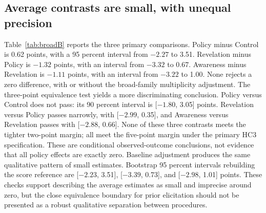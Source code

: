 \subsection{Average contrasts are small, with unequal precision}
Table~\ref{tab:broadB} reports the three primary comparisons. Policy minus Control is 0.62 points, with a 95 percent interval from $-2.27$ to 3.51. Revelation minus Policy is $-1.32$ points, with an interval from $-3.32$ to 0.67. Awareness minus Revelation is $-1.11$ points, with an interval from $-3.22$ to 1.00. None rejects a zero difference, with or without the broad-family multiplicity adjustment.
The three-point equivalence test yields a more discriminating conclusion. Policy versus Control does not pass: its 90 percent interval is [$-1.80$, 3.05] points. Revelation versus Policy passes narrowly, with [$-2.99$, 0.35], and Awareness versus Revelation passes with [$-2.88$, 0.66]. None of these three contrasts meets the tighter two-point margin; all meet the five-point margin under the primary HC3 specification. These are conditional observed-outcome conclusions, not evidence that all policy effects are exactly zero.
Baseline adjustment produces the same qualitative pattern of small estimates. Bootstrap 95 percent intervals rebuilding the score reference are [$-2.23$, 3.51], [$-3.39$, 0.73], and [$-2.98$, 1.01] points. These checks support describing the average estimates as small and imprecise around zero, but the close equivalence boundary for prior elicitation should not be presented as a robust qualitative separation between procedures.

